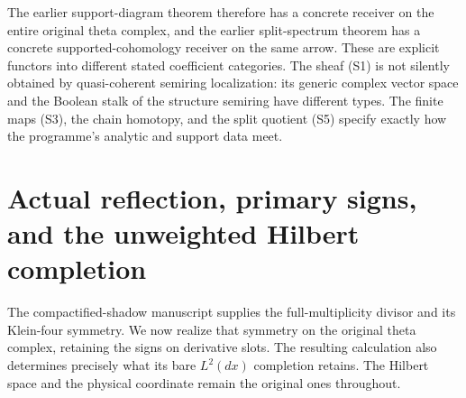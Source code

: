 \documentclass[11pt]{article}
\begin{document}
The earlier support-diagram theorem therefore has a concrete receiver
on the entire original theta complex, and the earlier split-spectrum
theorem has a concrete supported-cohomology receiver on the same
arrow. These are explicit functors into different stated coefficient
categories. The sheaf (S1) is not silently obtained by quasi-coherent
semiring localization: its generic complex vector space and the
Boolean stalk of the structure semiring have different types. The
finite maps (S3), the chain homotopy, and the split quotient (S5)
specify exactly how the programme's analytic and support data meet.

\section{Actual reflection, primary signs, and the unweighted Hilbert completion}
The compactified-shadow manuscript supplies the full-multiplicity
divisor and its Klein-four symmetry. We now realize that symmetry on
the original theta complex, retaining the signs on derivative slots.
The resulting calculation also determines precisely what its bare
$L^2(dx)$ completion retains. The Hilbert space and the physical
coordinate remain the original ones throughout.
\end{document}
